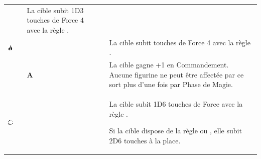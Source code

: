 \begin{center}
\begin{tabular}{>{\bf}M{1.75cm}>{\raggedright}m{2.1cm}M{1cm}M{1.9cm}M{1.5cm}m{7cm}}
\missile{} \newline
\damage{} &
\instant{} &
La cible subit 1D3 touches de Force 4 avec la règle \flamingattacks{}.
\tabularnewline
{} \includegraphics[width=1cm]{pics/fire.png} &
\firesignature{} &
\newline
{} \newline
{} &
 \newline
{} \newline
{} \newline
\hex{} \newline
\missile{} \newline
\damage{} &
\instant{} &
La cible subit    touches de Force 4 avec la règle \flamingattacks{}.
\tabularnewline
\hline
{} \lightTOC{} &
\lightattribute{} &
\textbf{A} &
 \newline
\augment{} &
\lastsoneturn{} &
La cible gagne +1 en Commandement. Aucune figurine ne peut être affectée par ce sort plus d'une fois par Phase de Magie.
\tabularnewline
{} \includegraphics[width=1cm]{pics/light.png} &
\lightsignature{} &
\newline
{} &
 \newline
{} \newline
\hex{} \newline
\missile{} \newline
\damage{} &
\instant{} &
La cible subit 1D6 touches de Force   avec la règle \flamingattacks{}.

\vspace*{5pt}
Si la cible dispose de la règle \otherworldly{} ou \undead{}, elle subit 2D6 touches à la place.
\tabularnewline
\end{tabular}
\end{center}



\newpage


